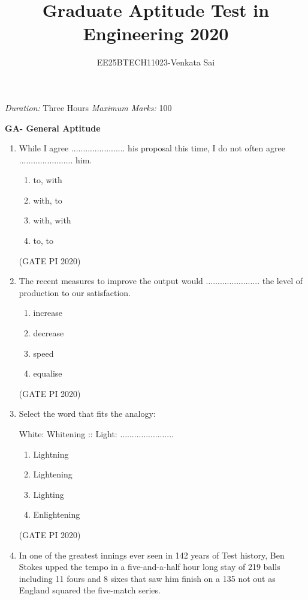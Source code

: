 \documentclass[journal,12pt,onecolumn]{IEEEtran}
\title{Graduate Aptitude Test in Engineering 2020}
\author{EE25BTECH11023-Venkata Sai}
\theoremstyle{remark}
\begin{document}
\noindent
\maketitle
\textit{Duration:} Three Hours \hfill \textit{Maximum Marks:} 100

\textbf{GA- General Aptitude}
\begin{enumerate}

\item While I agree ....................... his proposal this time, I do not often agree ....................... him.
\begin{enumerate}
    \item to, with
    \item with, to
    \item with, with
    \item to, to
\end{enumerate}

\hfill (GATE PI 2020)

\item The recent measures to improve the output would ....................... the level of production to our satisfaction.
\begin{enumerate}
    \item increase
    \item decrease
    \item speed
    \item equalise
\end{enumerate}

\hfill (GATE PI 2020)

\item Select the word that fits the analogy:

White: Whitening :: Light: .......................

\begin{enumerate}
    \item Lightning
    \item Lightening
    \item Lighting
    \item Enlightening
\end{enumerate}

\hfill (GATE PI 2020)

\item
In one of the greatest innings ever seen in 142 years of Test history, Ben Stokes upped the tempo in a five-and-a-half hour long stay of 219 balls including 11 fours and 8 sixes that saw him finish on a 135 not out as England squared the five-match series.


\end{enumerate}
\end{document}
